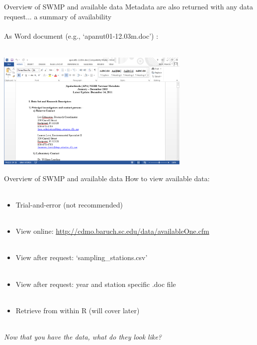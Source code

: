 \documentclass[xcolor=svgnames]{beamer}\usepackage[]{graphicx}\usepackage[]{color}
\begin{document}
\begin{frame}[t]{Overview of SWMP and available data}
Metadata are also returned with any data request... a summary of availability\\~\\
As Word document (e.g., `apanut01-12.03m.doc') :\\~\\
\centerline{\includegraphics[width = 0.7\textwidth]{meta_doc.png}}
\end{frame}

\begin{frame}{Overview of SWMP and available data}
\onslide<+->
How to view available data:\\~\\
\begin{itemize}
\item Trial-and-error (not recommended) \\~\\
\item View online: \href{http://cdmo.baruch.sc.edu/data/availableOne.cfm}{http://cdmo.baruch.sc.edu/data/availableOne.cfm}  \\~\\
\item View after request: `sampling_stations.csv'  \\~\\
\item View after request: year and station specific .doc file  \\~\\
\item Retrieve from within R (will cover later) \\~\\
\end{itemize}
\onslide<+->
\centerline{\emph{Now that you have the data, what do they look like?}} 
\end{frame}
\end{document}
